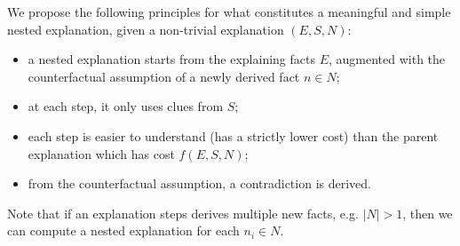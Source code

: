 






We propose the following principles for what constitutes a meaningful and simple nested explanation, given a non-trivial explanation $(E,S,N)$:
\begin{itemize}
 \item a nested explanation starts from the explaining facts $E$, %
 augmented with the counterfactual assumption of a newly derived fact $n \in N$; 
 \item at each step, it only uses clues from $S$;
 \item each step is easier to understand (has a strictly lower cost) than the parent explanation which has cost $f(E,S,N)$;
 \item from the counterfactual assumption, a contradiction is derived. %
\end{itemize}

Note that if an explanation steps derives multiple new facts, e.g. $|N| > 1$, then we can compute a nested explanation for each $n_i \in N$.

